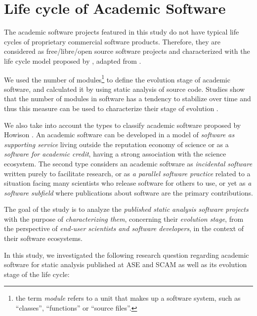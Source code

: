 \section{Life cycle of Academic Software} 
\label{study3}

The academic software projects featured in this study do not have typical life
cycles of proprietary commercial software products.  Therefore, they are
considered as free/libre/open source software projects and characterized with
the life cycle model proposed by \cite{capiluppi2007adapting},
adapted from \cite{rajlich2000staged}.

We used the number of modules\footnote{the term \textit{module}
refers to a unit that makes up a software system, such as ``classes'',
``functions'' or ``source files''.} to define the evolution stage of academic
software, and calculated it by using static analysis of source code.  Studies
show that the number of modules in software has a tendency to stabilize over
time and thus this measure can be used to characterize their stage of evolution
\cite{capiluppi2007adapting}.

We also take into account the types to classify academic software proposed by
Howison \cite{howison2011scientific}. An academic software can be developed in
a model of {\it software as supporting service} living outside the reputation
economy of science or as a {\it software for academic credit}, having a strong
association with the science ecosystem. The second type considers an academic
software as {\it incidental software} written purely to facilitate research, or
as {\it a parallel software practice} related to a situation facing many
scientists who release software for others to use, or yet as {\it a software
subfield} where publications about software are the primary contributions.

%
The goal of the study is to analyze the \textit{published static analysis
software projects} with the purpose of \textit{characterizing them}, concerning
their \textit{evolution stage}, from the perspective of \textit{end-user
scientists and software developers}, in the context of their software
ecosystems.

In this study, we investigated the following research question regarding
academic software for static analysis published at ASE and SCAM
as well as its evolution stage of the life cycle:

\newcommand{\StudyThreeQuestionOne}{
	\textbf{(RQ2.1)} \textit{In which evolution stage of the software life cycle defined by
Capiluppi's model \cite{capiluppi2007adapting}, are these academic software?}
}


